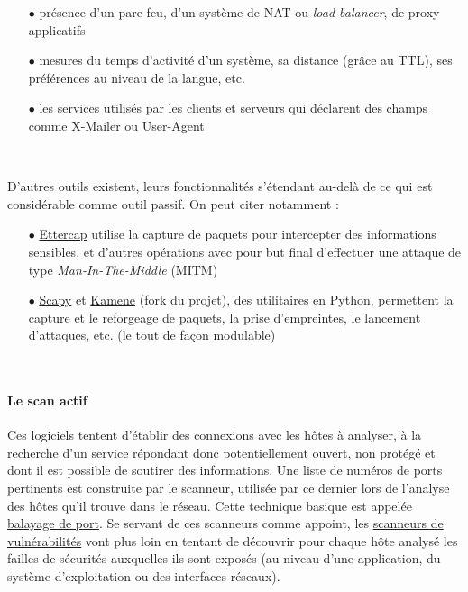 \documentclass[]{article}
\begin{document}
\begin{itemize}
\vspace{0.2cm}
\item[$\bullet$] présence d'un pare-feu, d'un système de NAT ou \textit{load balancer}, de proxy applicatifs
\vspace{0.2cm}
\item[$\bullet$] mesures du temps d'activité d'un système, sa distance (grâce au TTL), ses préférences au niveau de la langue, etc.
\vspace{0.2cm}
\item[$\bullet$] les services utilisés par les clients et serveurs qui déclarent des champs comme X-Mailer ou User-Agent
\end{itemize}
~
\par D'autres outils existent, leurs fonctionnalités s'étendant au-delà de ce qui est considérable comme outil passif. On peut citer notamment :
\begin{itemize}
\vspace{0.2cm}
\item[$\bullet$] \href{http://www.ettercap-project.org/}{Ettercap} utilise la capture de paquets pour intercepter des informations sensibles, et d'autres opérations avec pour but final d'effectuer une attaque de type \textit{Man-In-The-Middle} (MITM)
\vspace{0.2cm}
\item[$\bullet$] \href{https://scapy.net/}{Scapy} et \href{https://github.com/phaethon/kamene}{Kamene} (fork du projet), des utilitaires en Python, permettent la capture et le reforgeage de paquets, la prise d'empreintes, le lancement d'attaques, etc. (le tout de façon modulable)
\end{itemize}
~\\

\newpage

\paragraph{Le scan actif}

\par Ces logiciels tentent d'établir des connexions avec les hôtes à analyser, à la recherche d'un service répondant donc potentiellement ouvert, non protégé et dont il est possible de soutirer des informations. Une liste de numéros de ports pertinents est construite par le scanneur, utilisée par ce dernier lors de l'analyse des hôtes qu'il trouve dans le réseau. Cette technique basique est appelée \href{https://fr.wikipedia.org/wiki/Balayage_de_ports}{balayage de port}.   Se servant de ces scanneurs comme appoint, les \href{https://fr.wikipedia.org/wiki/Scanneur_de_vuln\%C3\%A9rabilit\%C3\%A9}{scanneurs de vulnérabilités} vont plus loin en tentant de découvrir pour chaque hôte analysé les failles de sécurités auxquelles ils sont exposés (au niveau d'une application, du système d'exploitation ou des interfaces réseaux).\\
\end{document}
